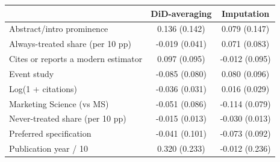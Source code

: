 \begin{tabular}{lcc}
\toprule
 & DiD-averaging & Imputation \\
\midrule
Abstract/intro prominence & 0.136 (0.142) & 0.079 (0.147) \\
Always-treated share (per 10 pp) & -0.019 (0.041) & 0.071 (0.083) \\
Cites or reports a modern estimator & 0.097 (0.095) & -0.012 (0.095) \\
Event study & -0.085 (0.080) & 0.080 (0.096) \\
Log(1 + citations) & -0.036 (0.031) & 0.016 (0.029) \\
Marketing Science (vs MS) & -0.051 (0.086) & -0.114 (0.079) \\
Never-treated share (per 10 pp) & -0.015 (0.013) & -0.030 (0.013) \\
Preferred specification & -0.041 (0.101) & -0.073 (0.092) \\
Publication year / 10 & 0.320 (0.233) & -0.012 (0.236) \\
\bottomrule
\end{tabular}
